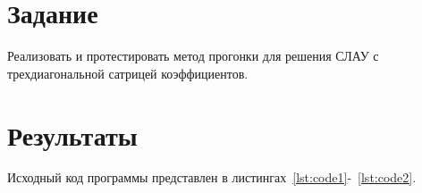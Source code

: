 \documentclass[a4paper, 14pt]{extarticle}
\begin{document}
\renewcommand{\ttdefault}{pcr}

\setlength{\tabcolsep}{3pt}
\newpage
\setcounter{page}{2}

\section{Задание}\label{Sect::task}

Реализовать и протестировать метод прогонки для решения СЛАУ с трехдиагональной сатрицей коэффициентов.

\section{Результаты}\label{Sect::res}

Исходный код программы представлен в листингах~\ref{lst:code1}-~\ref{lst:code2}.
\end{document}

